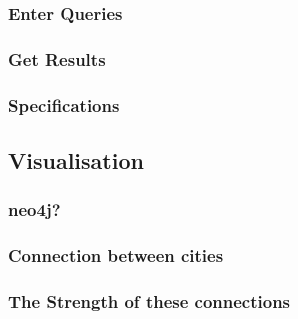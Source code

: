 \subsubsection{Enter Queries}
\subsubsection{Get Results}
\subsubsection{Specifications}

\subsection{Visualisation}
\subsubsection{neo4j?}

\subsubsection{Connection between cities}
\subsubsection{The Strength of these connections}